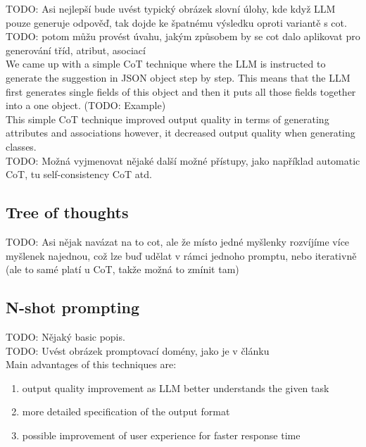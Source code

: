 TODO: Asi nejlepší bude uvést typický obrázek slovní úlohy, kde když LLM pouze generuje odpověď, tak dojde ke špatnému výsledku oproti variantě s cot. \\

TODO: potom můžu provést úvahu, jakým způsobem by se cot dalo aplikovat pro generování tříd, atribut, asociací \\

We came up with a simple CoT technique where the LLM is instructed to generate the  suggestion in JSON object step by step. This means that the LLM first generates single fields of this object and then it puts all those fields together into a one object. (TODO: Example) \\

This simple CoT technique improved output quality in terms of generating attributes and associations however, it decreased output quality when generating classes. \\

TODO: Možná vyjmenovat nějaké další možné přístupy, jako například automatic CoT, tu self-consistency CoT atd. \\


\subsection{Tree of thoughts}

TODO: Asi nějak navázat na to cot, ale že místo jedné myšlenky rozvíjíme více myšlenek najednou, což lze buď udělat v rámci jednoho promptu, nebo iterativně (ale to samé platí u CoT, takže možná to zmínit tam)


\subsection{N-shot prompting}

TODO: Nějaký basic popis. \\

TODO: Uvést obrázek promptovací domény, jako je v článku \\

Main advantages of this techniques are:

\begin{enumerate}
\item output quality improvement as LLM better understands the given task
\item more detailed specification of the output format
\item possible improvement of user experience for faster response time
\end{enumerate}

